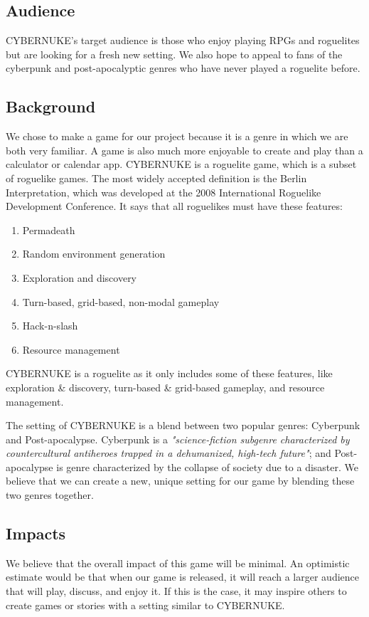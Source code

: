 \documentclass[10pt,conference,onecolumn,compsoc]{IEEEtran}
\begin{document}

\subsection{Audience}
CYBERNUKE's target audience is those who enjoy playing RPGs and roguelites but are looking for a fresh new setting. We also hope to appeal to fans of the cyberpunk and post-apocalyptic genres who have never played a roguelite before.

\pagebreak
\subsection{Background}
We chose to make a game for our project because it is a genre in which we are both very familiar. A game is also much more enjoyable to create and play than a calculator or calendar app. CYBERNUKE is a roguelite game, which is a subset of roguelike games. The most widely accepted definition is the Berlin Interpretation, which was developed at the 2008 International Roguelike Development Conference.\cite{IEEEhowto:roguelite_2} It says that all roguelikes must have these features:
\begin{enumerate}
\item Permadeath
\item Random environment generation
\item Exploration and discovery
\item Turn-based, grid-based, non-modal gameplay
\item Hack-n-slash
\item Resource management
\end{enumerate}

CYBERNUKE is a roguelite as it only includes some of these features, like exploration \& discovery, turn-based \& grid-based gameplay, and resource management.

The setting of CYBERNUKE is a blend between two popular genres: Cyberpunk and Post-apocalypse.  Cyberpunk is a \emph{"science-fiction subgenre characterized by countercultural antiheroes trapped in a dehumanized, high-tech future"}\cite{IEEEhowto:cyberpunk}; and Post-apocalypse is genre characterized by the collapse of society due to a disaster. We believe that we can create a new, unique setting for our game by blending these two genres together.

\subsection{Impacts}
We believe that the overall impact of this game will be minimal. An optimistic estimate would be that when our game is released, it will reach a larger audience that will play, discuss, and enjoy it. If this is the case, it may inspire others to create games or stories with a setting similar to CYBERNUKE.
\end{document}
